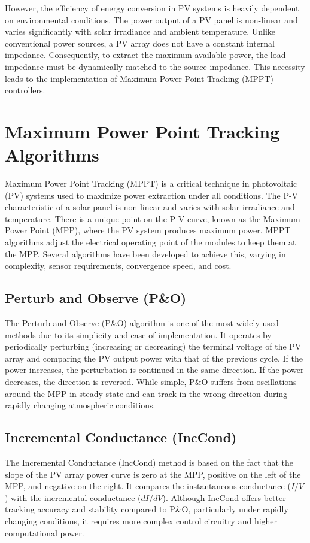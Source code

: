 \documentclass[a4paper,oneside,12pt]{report}
\numberwithin{equation}{chapter}
\begin{document}
However, the efficiency of energy conversion in PV systems is heavily dependent on environmental conditions. The power output of a PV panel is non-linear and varies significantly with solar irradiance and ambient temperature. Unlike conventional power sources, a PV array does not have a constant internal impedance. Consequently, to extract the maximum available power, the load impedance must be dynamically matched to the source impedance. This necessity leads to the implementation of Maximum Power Point Tracking (MPPT) controllers.

\section{Maximum Power Point Tracking Algorithms}\label{sec:intro_mppt_techniques}
Maximum Power Point Tracking (MPPT) is a critical technique in photovoltaic (PV) systems used to maximize power extraction under all conditions. The P-V characteristic of a solar panel is non-linear and varies with solar irradiance and temperature. There is a unique point on the P-V curve, known as the Maximum Power Point (MPP), where the PV system produces maximum power. MPPT algorithms adjust the electrical operating point of the modules to keep them at the MPP. Several algorithms have been developed to achieve this, varying in complexity, sensor requirements, convergence speed, and cost.

\subsection{Perturb and Observe (P\&O)}
The Perturb and Observe (P\&O) algorithm is one of the most widely used methods due to its simplicity and ease of implementation. It operates by periodically perturbing (increasing or decreasing) the terminal voltage of the PV array and comparing the PV output power with that of the previous cycle. If the power increases, the perturbation is continued in the same direction. If the power decreases, the direction is reversed. While simple, P\&O suffers from oscillations around the MPP in steady state and can track in the wrong direction during rapidly changing atmospheric conditions.

\subsection{Incremental Conductance (IncCond)}
The Incremental Conductance (IncCond) method is based on the fact that the slope of the PV array power curve is zero at the MPP, positive on the left of the MPP, and negative on the right. It compares the instantaneous conductance ($I/V$) with the incremental conductance ($dI/dV$). Although IncCond offers better tracking accuracy and stability compared to P\&O, particularly under rapidly changing conditions, it requires more complex control circuitry and higher computational power.
\end{document}
